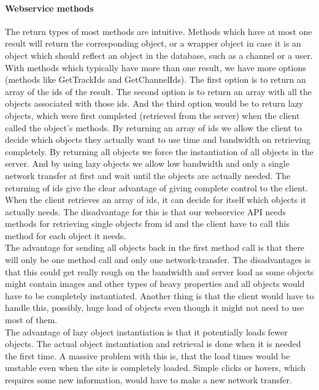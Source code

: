 \documentclass[a4paper,11pt,report]{article}
\begin{document}
\paragraph{Webservice methods}
The return types of most methods are intuitive. Methods which have at most one result will return the corresponding object, or a wrapper object in case it is an object which should reflect an object in the database, such as a channel or a user. \\
With methods which typically have more than one result, we have more options (methods like GetTrackIds and GetChannelIds). 
The first option is to return an array of the ids of the result. The second option is to return an array with all the objects associated with those ids. And the third option would be to return lazy objects, which were first completed (retrieved from the server) when the client called the object's methods. By returning an array of ids we allow the client to decide which objects they actually want to use time and bandwidth on retrieving completely. By returning all objects we force the instantiation of all objects in the server. And by using lazy objects we allow low bandwidth and only a single network transfer at first and wait until the objects are actually needed.
The returning of ids give the clear advantage of giving complete control to the client. When the client retrieves an array of ids, it can decide for itself which objects it actually needs. The disadvantage for this is that our webservice API needs methods for retrieving single objects from id and the client have to call this method for each object it needs. \\
The advantage for sending all objects back in the first method call is that there will only be one method call and only one network-transfer. The disadvantages is that this could get really rough on the bandwidth and server load as some objects might contain images and other types of heavy properties and all objects would have to be completely instantiated. Another thing is that the client would have to handle this, possibly, huge load of objects even though it might not need to use most of them. \\
The advantage of lazy object instantiation is that it potentially loads fewer objects. The actual object instantiation and retrieval is done when it is needed the first time. A massive problem with this is, that the load times would be unstable even when the site is completely loaded. Simple clicks or hovers, which requires some new information, would have to make a new network transfer. \\
\end{document}
